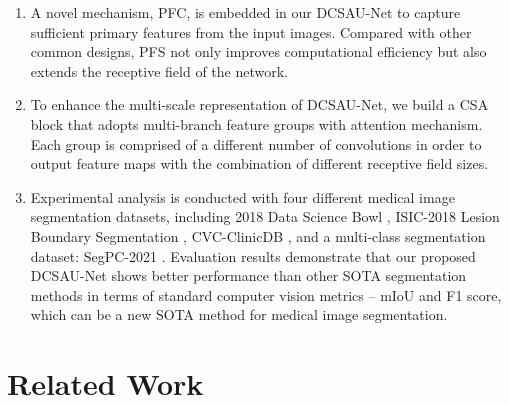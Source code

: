 \documentclass[a4paper,fleqn]{cas-dc}
\begin{document}
\begin{enumerate}[1)]
    \item A novel mechanism, PFC, is embedded in our DCSAU-Net to capture sufficient primary features from the input images. Compared with other common designs, PFS not only improves computational efficiency but also extends the receptive field of the network. 
    \item To enhance the multi-scale representation of DCSAU-Net, we build a CSA block that adopts multi-branch feature groups with attention mechanism. Each group is comprised of a different number of convolutions in order to output feature maps with the combination of different receptive field sizes. 
    \item Experimental analysis is conducted with four different medical image segmentation datasets, including 2018 Data Science Bowl \cite{caicedo2019nucleus}, ISIC-2018 Lesion Boundary Segmentation \cite{codella2018skin, tschandl2018ham10000}, CVC-ClinicDB \cite{bernal2015wm}, and a multi-class segmentation dataset: SegPC-2021 \cite{7np1-2q42-21}. Evaluation results demonstrate that our proposed DCSAU-Net shows better performance than other SOTA segmentation methods in terms of standard computer vision metrics – mIoU and F1 score, which can be a new SOTA method for medical image segmentation.
\end{enumerate}









\section{Related Work}
\end{document}
